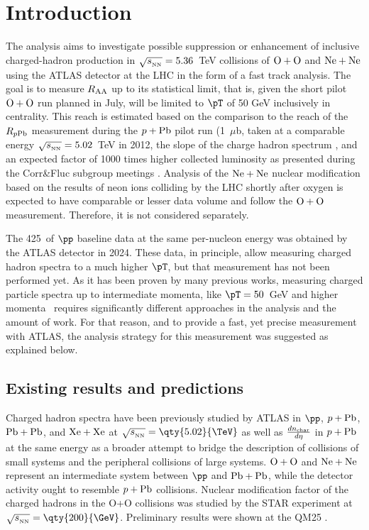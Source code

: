 \chapter{Introduction}
\label{chap:intro}

The analysis aims to investigate possible suppression or enhancement of inclusive charged-hadron production in $\sqrt{s_{_\text{NN}}}=5.36$~TeV collisions of $\OO$ and $\NeNe$ using the ATLAS detector at the LHC in the form of a fast track analysis. The goal is to measure $\RAA$ up to its statistical limit, that is, given the short pilot $\OO$ run planned in July, will be limited to $\pT$ of 50 GeV inclusively in centrality. This reach is estimated based on the comparison to the reach of the $\RpPb$ measurement during the $\pPb$ pilot run (1~$\mu$b, \cite{pPb_pilot} taken at a comparable energy $\sqrt{s_{_\text{NN}}}=5.02$~TeV in 2012, the slope of the charge hadron spectrum \cite{chargedHadronATLAS}, and an expected factor of 1000 times higher collected luminosity as presented during the Corr\&Fluc subgroup meetings \cite{pt_reach_projection_1}. Analysis of the $\NeNe$ nuclear modification based on the results of neon ions colliding by the LHC shortly after oxygen is expected to have comparable or lesser data volume and follow the $\OO$ measurement. Therefore, it is not considered separately. 

The 425~\ipb of $\pp$ baseline data at the same per-nucleon energy was obtained by the ATLAS detector in 2024. These data, in principle, allow measuring charged hadron spectra to a much higher $\pT$, but that measurement has not been performed yet. As it has been proven by many previous works, measuring charged particle spectra up to intermediate momenta, like $\pT=50$~GeV and higher momenta~\cite{chargedHadronATLAS} requires significantly different approaches in the analysis and the amount of work. For that reason, and to provide a fast, yet precise measurement with ATLAS, the analysis strategy for this measurement was suggested as explained below. 

\section{Existing results and predictions}

Charged hadron spectra have been previously studied by ATLAS in $\pp$, $\pPb$, $\PbPb$, and $\XeXe$ at $\sqn=\qty{5.02}{\TeV}$ \cite{chargedHadronATLAS} as well as $\frac{dn_\text{char}}{d\eta}$ in $\pPb$ at the same energy \cite{ATLAS:2015hkr} as a broader attempt to bridge the description of collisions of small systems and the peripheral collisions of large systems. $\OO$ and $\NeNe$ represent an intermediate system between $\pp$ and $\PbPb$, while the detector activity ought to resemble $\pPb$ collisions. Nuclear modification factor of the charged hadrons in the O+O collisions was studied by the STAR experiment at $\sqn = \qty{200}{\GeV}$. Preliminary results were shown at the QM25 \cite{star_roo_qm25}.

